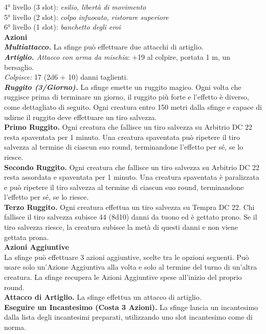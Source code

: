 \begin{multicols}{2}
4° livello (3 slot): \emph{esilio, libertà di movimento}\\
5° livello (2 slot): \emph{colpo infuocato, ristorare superiore}\\
6° livello (1 slot): \emph{banchetto degli eroi}\\
\smallskip\textbf{Azioni}\\
\emph{\textbf{Multiattacco.}} La sfinge può effettuare due attacchi di artiglio.\\
\emph{\textbf{Artiglio.} Attacco con arma da mischia}: +19 al colpire, portata 1 m, un bersaglio.\\
\emph{Colpisce:} 17 (2d6 + 10) danni taglienti.\\
\emph{\textbf{Ruggito (3/Giorno).}} La sfinge emette un ruggito magico. Ogni volta che ruggisce prima di terminare un giorno, il ruggito più forte e l'effetto è diverso, come dettagliato di seguito. Ogni creatura entro 150 metri dalla sfinge e capace di udirne il ruggito deve effettuare un tiro salvezza.\\
\textbf{Primo Ruggito.} Ogni creatura che fallisce un tiro salvezza su Arbitrio DC  22 resta spaventata per 1 minuto. Una creatura spaventata può ripetere il tiro salvezza al termine di ciascun suo round, terminandone l'effetto per sé, se lo riesce.\\
\textbf{Secondo Ruggito.} Ogni creatura che fallisce un tiro salvezza su Arbitrio DC  22 resta assordata e spaventata per 1 minuto. Una creatura spaventata è paralizzata e può ripetere il tiro salvezza al termine di ciascun suo round, terminandone l'effetto per sé, se lo riesce.\\
\textbf{Terzo Ruggito.} Ogni creatura effettua un tiro salvezza su Tempra DC  22. Chi fallisce il tiro salvezza subisce 44 (8d10) danni da tuono ed è gettato prono. Se il tiro salvezza riesce, la
creatura subisce la metà di questi danni e non viene gettata prona.\\
\textbf{Azioni Aggiuntive}\\
La sfinge può effettuare 3 azioni aggiuntive, scelte tra le opzioni seguenti. Può usare solo un'Azione Aggiuntiva alla volta e solo al termine del turno di un'altra creatura. La sfinge recupera le Azioni Aggiuntive spese all'inizio del proprio round.\\
\textbf{Attacco di Artiglio.} La sfinge effettua un attacco di artiglio. \\
\textbf{Eseguire un Incantesimo (Costa 3 Azioni).} La sfinge lancia un incantesimo dalla lista degli incantesimi preparati, utilizzando uno slot incantesimo come di norma.\\

\end{multicols}
